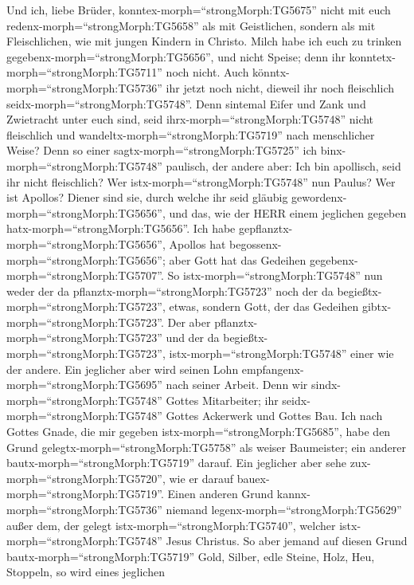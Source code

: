  Und ich, liebe Brüder, konntex-morph=``strongMorph:TG5675''
nicht mit euch redenx-morph=``strongMorph:TG5658'' als mit Geistlichen,
sondern als mit Fleischlichen, wie mit jungen Kindern in Christo.
 Milch habe ich euch zu trinken
gegebenx-morph=``strongMorph:TG5656'', und nicht Speise; denn ihr
konntetx-morph=``strongMorph:TG5711'' noch nicht. Auch
könntx-morph=``strongMorph:TG5736'' ihr jetzt noch nicht, 
dieweil ihr noch fleischlich seidx-morph=``strongMorph:TG5748''. Denn
sintemal Eifer und Zank und Zwietracht unter euch sind, seid
ihrx-morph=``strongMorph:TG5748'' nicht fleischlich und
wandeltx-morph=``strongMorph:TG5719'' nach menschlicher Weise?
 Denn so einer sagtx-morph=``strongMorph:TG5725'' ich
binx-morph=``strongMorph:TG5748'' paulisch, der andere aber: Ich bin
apollisch, seid ihr nicht fleischlich?  Wer
istx-morph=``strongMorph:TG5748'' nun Paulus? Wer ist Apollos? Diener
sind sie, durch welche ihr seid gläubig
gewordenx-morph=``strongMorph:TG5656'', und das, wie der HERR einem
jeglichen gegeben hatx-morph=``strongMorph:TG5656''.  Ich
habe gepflanztx-morph=``strongMorph:TG5656'', Apollos hat
begossenx-morph=``strongMorph:TG5656''; aber Gott hat das Gedeihen
gegebenx-morph=``strongMorph:TG5707''.  So
istx-morph=``strongMorph:TG5748'' nun weder der da
pflanztx-morph=``strongMorph:TG5723'' noch der da
begießtx-morph=``strongMorph:TG5723'', etwas, sondern Gott, der das
Gedeihen gibtx-morph=``strongMorph:TG5723''.  Der aber
pflanztx-morph=``strongMorph:TG5723'' und der da
begießtx-morph=``strongMorph:TG5723'', istx-morph=``strongMorph:TG5748''
einer wie der andere. Ein jeglicher aber wird seinen Lohn
empfangenx-morph=``strongMorph:TG5695'' nach seiner Arbeit. 
Denn wir sindx-morph=``strongMorph:TG5748'' Gottes Mitarbeiter; ihr
seidx-morph=``strongMorph:TG5748'' Gottes Ackerwerk und Gottes Bau.
 Ich nach Gottes Gnade, die mir gegeben
istx-morph=``strongMorph:TG5685'', habe den Grund
gelegtx-morph=``strongMorph:TG5758'' als weiser Baumeister; ein anderer
bautx-morph=``strongMorph:TG5719'' darauf. Ein jeglicher aber sehe
zux-morph=``strongMorph:TG5720'', wie er darauf
bauex-morph=``strongMorph:TG5719''.  Einen anderen Grund
kannx-morph=``strongMorph:TG5736'' niemand
legenx-morph=``strongMorph:TG5629'' außer dem, der gelegt
istx-morph=``strongMorph:TG5740'', welcher
istx-morph=``strongMorph:TG5748'' Jesus Christus.  So aber
jemand auf diesen Grund bautx-morph=``strongMorph:TG5719'' Gold, Silber,
edle Steine, Holz, Heu, Stoppeln,  so wird eines jeglichen
